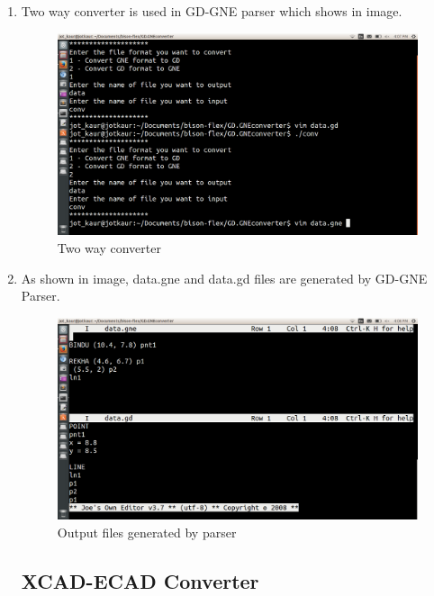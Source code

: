 \begin{enumerate}
\item Two way converter is used in GD-GNE parser which shows in image.
\begin{figure} [h!]
\centering
\includegraphics[scale=0.2]{images/gnefinal.png}
\caption{Two way converter}
\end{figure}

\item As shown in image, data.gne and data.gd files are generated by GD-GNE Parser.
\begin{figure} [h!]
\centering
\includegraphics[scale=0.2]{images/gneoutput.png}
\caption{Output files generated by parser}
\end{figure}

\newpage
\subsection{XCAD-ECAD Converter}


\end{enumerate}

